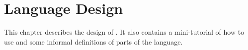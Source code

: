 \chapter{Language Design}
This chapter describes the design of \lang{}. It also contains a mini-tutorial of how to use \lang{} and some informal definitions of parts of the language. 




